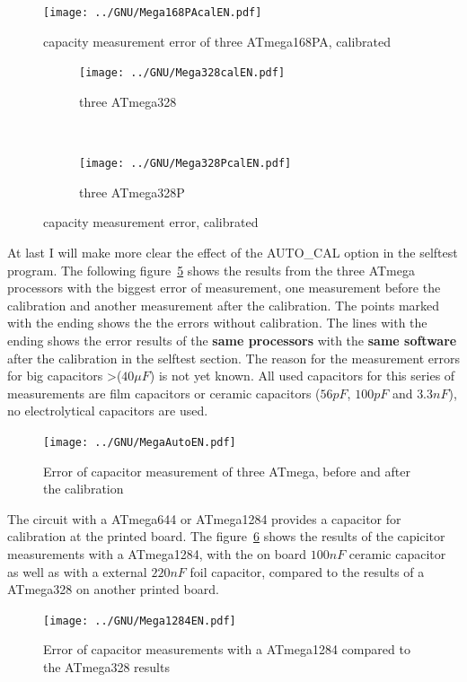 \begin{figure}[H]
\centering
\texttt{[image: ../GNU/Mega168PAcalEN.pdf]}
\caption{capacity measurement error of three ATmega168PA, calibrated}
\label{fig:mega168PAcal}
\end{figure}

\begin{figure}[H]
  \begin{subfigure}[b]{.5\textwidth}
    \centering
    \texttt{[image: ../GNU/Mega328calEN.pdf]}
    \caption{three ATmega328}
    \label{fig:mega328cal}
  \end{subfigure}
  ~
  \begin{subfigure}[b]{.5\textwidth}
    \centering
    \texttt{[image: ../GNU/Mega328PcalEN.pdf]}
    \caption{three ATmega328P}
    \label{fig:mega328Pcal}
  \end{subfigure}
  \caption{capacity measurement error, calibrated}
\end{figure}

At last I will make more clear the effect of the AUTO\_CAL option in the selftest program.
The following figure~\ref{fig:MegaAuto} shows the results from the three ATmega processors
with the biggest error of measurement, one measurement before the calibration and another
measurement after the calibration.
The points marked with the ending  shows the the errors without calibration.
The lines with the ending  shows the error results of the \textbf {same processors} 
with the \textbf {same software} after the calibration in the selftest section.
The reason for the measurement errors for big capacitors \textgreater(\(40\mu F\)) is
not yet known. All used capacitors for this series of measurements are film capacitors or
ceramic capacitors (\(56pF\), \(100pF\) and \(3.3nF\)), no electrolytical capacitors are used.

\begin{figure}[H]
\centering
\texttt{[image: ../GNU/MegaAutoEN.pdf]}
\caption{Error of capacitor measurement of three ATmega, before and after the calibration}
\label{fig:MegaAuto}
\end{figure}

The circuit with a ATmega644 or ATmega1284 provides a capacitor for calibration at the printed board.
The figure~\ref{fig:Mega1284} shows the results of the capicitor measurements with a ATmega1284,
with the on board \(100nF\) ceramic capacitor as well as with a external \(220nF\) foil capacitor, compared
to the results of a ATmega328 on another printed board.

\begin{figure}[H]
\centering
\texttt{[image: ../GNU/Mega1284EN.pdf]}
\caption{Error of capacitor measurements with a ATmega1284 compared to the ATmega328 results}
\label{fig:Mega1284}
\end{figure}

